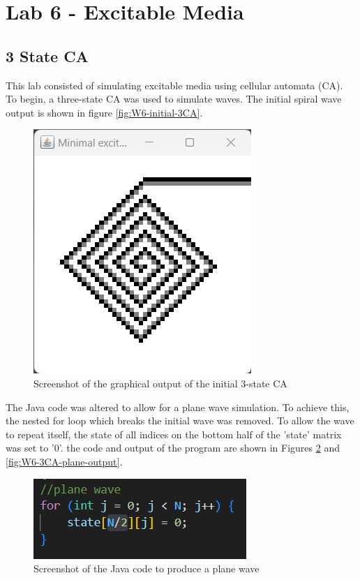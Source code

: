 \newpage
\section{Lab 6 - Excitable Media} 
\subsection{3 State CA}
This lab consisted of simulating excitable media using cellular automata (CA). To begin, a three-state CA was used to simulate waves. The initial spiral wave output is shown in figure \autoref{fig:W6-initial-3CA}.

\begin{figure}[H] 
    \centering
    \includegraphics[width=0.49\columnwidth]{Figures/Week 6/3stateCA-Initial.png}
    \caption{Screenshot of the graphical output of the initial 3-state CA}
    \label{fig:W6-initial-3CA}
\end{figure}

The Java code was altered to allow for a plane wave simulation. To achieve this, the nested for loop which breaks the initial wave was removed. To allow the wave to repeat itself, the state of all indices on the bottom half of the 'state' matrix was set to '0'. the code and output of the program are shown in Figures \ref{fig:W6-3CA-plane-code} and \ref{fig:W6-3CA-plane-output}. 


\begin{figure}[H] 
    \centering
    \includegraphics[width=0.49\columnwidth]{Figures/Week 6/3stateCA-plane-code.png}
    \caption{Screenshot of the Java code to produce a plane wave}
    \label{fig:W6-3CA-plane-code}
\end{figure}

